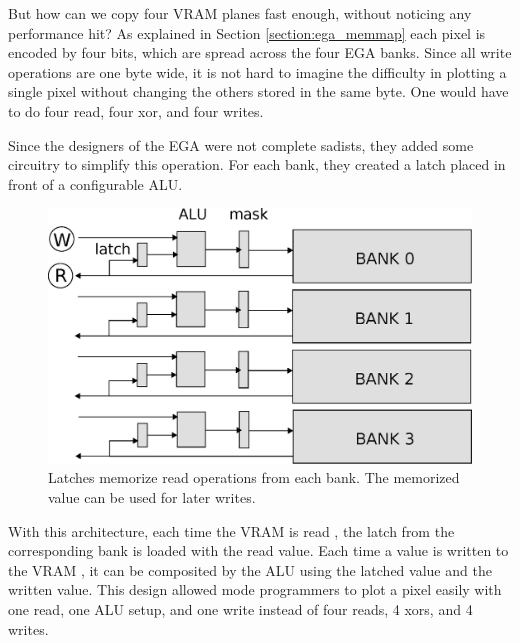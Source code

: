 \documentclass[book.tex]{subfiles}
\begin{document}
\par
\begin{minipage}{\textwidth}
  
  \end{minipage}
  \label{ega_refresh}
  \par
But how can we copy four VRAM planes fast enough, without noticing any performance hit? As explained in Section \ref{section:ega_memmap} each pixel is encoded by four bits, which are spread across the four EGA banks. Since all write operations are one byte wide, it is not hard to imagine the difficulty in plotting a single pixel without changing the others stored in the same byte. One would have to do four read, four xor, and four writes.\\
\par
 Since the designers of the EGA were not complete sadists, they added some circuitry to simplify this operation. For each bank, they created a latch placed in front of a configurable ALU.\\
\par
 \begin{figure}[H]
\centering
 \includegraphics[width=\textwidth]{imgs/drawings/latches.eps}
 \caption{Latches memorize read operations from each bank. The memorized value can be used for later writes.}
 \end{figure}
With this architecture, each time the VRAM is read , the latch from the corresponding bank is loaded with the read value. Each time a value is written to the VRAM , it can be composited by the ALU using the latched value and the written value. This design allowed mode  programmers to plot a pixel easily with one read, one ALU setup, and one write instead of four reads, 4 xors, and 4 writes.\\
\end{document}
